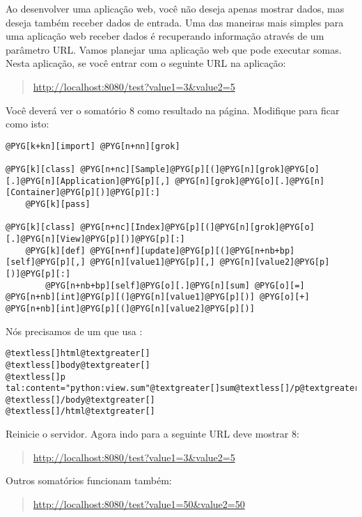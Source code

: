 \documentclass[a4paper,12pt,portuguese]{manual}
\begin{document}
Ao desenvolver uma aplicação web, você não deseja apenas mostrar
dados, mas deseja também receber dados de entrada. Uma das maneiras
mais simples para uma aplicação web receber dados é recuperando
informação através de um parâmetro URL. Vamos planejar uma aplicação web
que pode executar somas. Nesta aplicação, se você entrar com
o seguinte URL na aplicação:
\begin{quote}

\href{http://localhost:8080/test?value1=3\&value2=5}{http://localhost:8080/test?value1=3\&value2=5}
\end{quote}

Você deverá ver o somatório 8 como resultado na página.
Modifique  para ficar como isto:

\begin{Verbatim}[commandchars=@\[\]]
@PYG[k+kn][import] @PYG[n+nn][grok]

@PYG[k][class] @PYG[n+nc][Sample]@PYG[p][(]@PYG[n][grok]@PYG[o][.]@PYG[n][Application]@PYG[p][,] @PYG[n][grok]@PYG[o][.]@PYG[n][Container]@PYG[p][)]@PYG[p][:]
    @PYG[k][pass]

@PYG[k][class] @PYG[n+nc][Index]@PYG[p][(]@PYG[n][grok]@PYG[o][.]@PYG[n][View]@PYG[p][)]@PYG[p][:]
    @PYG[k][def] @PYG[n+nf][update]@PYG[p][(]@PYG[n+nb+bp][self]@PYG[p][,] @PYG[n][value1]@PYG[p][,] @PYG[n][value2]@PYG[p][)]@PYG[p][:]
        @PYG[n+nb+bp][self]@PYG[o][.]@PYG[n][sum] @PYG[o][=] @PYG[n+nb][int]@PYG[p][(]@PYG[n][value1]@PYG[p][)] @PYG[o][+] @PYG[n+nb][int]@PYG[p][(]@PYG[n][value2]@PYG[p][)]
\end{Verbatim}

Nós precisamos de um  que usa :

\begin{Verbatim}[commandchars=@\[\]]
@textless[]html@textgreater[]
@textless[]body@textgreater[]
@textless[]p tal:content="python:view.sum"@textgreater[]sum@textless[]/p@textgreater[]
@textless[]/body@textgreater[]
@textless[]/html@textgreater[]
\end{Verbatim}

Reinicie o servidor. Agora indo para a seguinte URL deve mostrar 8:
\begin{quote}

\href{http://localhost:8080/test?value1=3\&value2=5}{http://localhost:8080/test?value1=3\&value2=5}
\end{quote}

Outros somatórios funcionam também:
\begin{quote}

\href{http://localhost:8080/test?value1=50\&value2=50}{http://localhost:8080/test?value1=50\&value2=50}
\end{quote}
\end{document}

